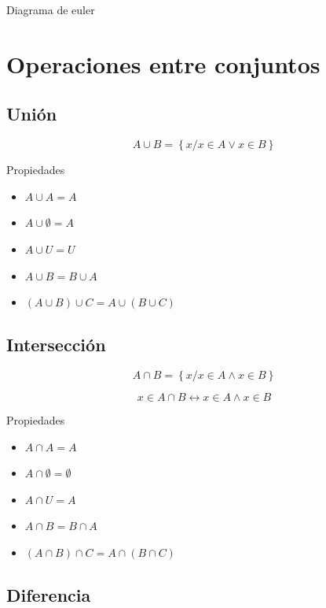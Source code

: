 \documentclass[
  16pt,
]{krantz}
\providecommand{\tightlist}{%
  \setlength{\itemsep}{0pt}\setlength{\parskip}{0pt}}
\theoremstyle{definition}
\theoremstyle{definition}
\theoremstyle{definition}
\theoremstyle{definition}
\theoremstyle{remark}
\begin{document}
Diagrama de euler

\hypertarget{operaciones-entre-conjuntos}{%
\section{Operaciones entre conjuntos}\label{operaciones-entre-conjuntos}}

\hypertarget{uniuxf3n}{%
\subsection{Unión}\label{uniuxf3n}}

\[
A\cup B
=\left\{x/x\in A\vee x\in B\right\}
\]

Propiedades

\begin{itemize}
\tightlist
\item
  \(A\cup A=A\)
\item
  \(A\cup \emptyset=A\)
\item
  \(A\cup U=U\)
\item
  \(A\cup B=B\cup A\)
\item
  \((A\cup B)\cup C=A\cup(B\cup C)\)
\end{itemize}

\hypertarget{intersecciuxf3n}{%
\subsection{Intersección}\label{intersecciuxf3n}}

\[
A\cap B=\left\{x/x\in A\wedge x\in B\right\}
\]

\[
x\in A\cap B\leftrightarrow x\in A\wedge x\in B
\]

Propiedades

\begin{itemize}
\tightlist
\item
  \(A\cap A=A\)
\item
  \(A\cap \emptyset=\emptyset\)
\item
  \(A\cap U=A\)
\item
  \(A\cap B=B\cap A\)
\item
  \((A\cap B)\cap C=A\cap(B\cap C)\)
\end{itemize}

\hypertarget{diferencia}{%
\subsection{Diferencia}\label{diferencia}}
\end{document}
